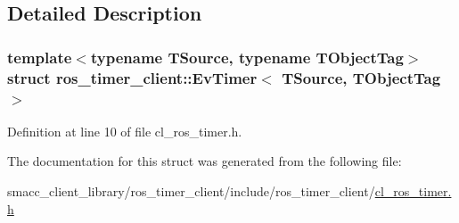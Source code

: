 \subsection{Detailed Description}
\subsubsection*{template$<$typename T\+Source, typename T\+Object\+Tag$>$\newline
struct ros\+\_\+timer\+\_\+client\+::\+Ev\+Timer$<$ T\+Source, T\+Object\+Tag $>$}



Definition at line 10 of file cl\+\_\+ros\+\_\+timer.\+h.



The documentation for this struct was generated from the following file\+:\begin{DoxyCompactItemize}
\item 
smacc\+\_\+client\+\_\+library/ros\+\_\+timer\+\_\+client/include/ros\+\_\+timer\+\_\+client/\hyperlink{cl__ros__timer_8h}{cl\+\_\+ros\+\_\+timer.\+h}\end{DoxyCompactItemize}
